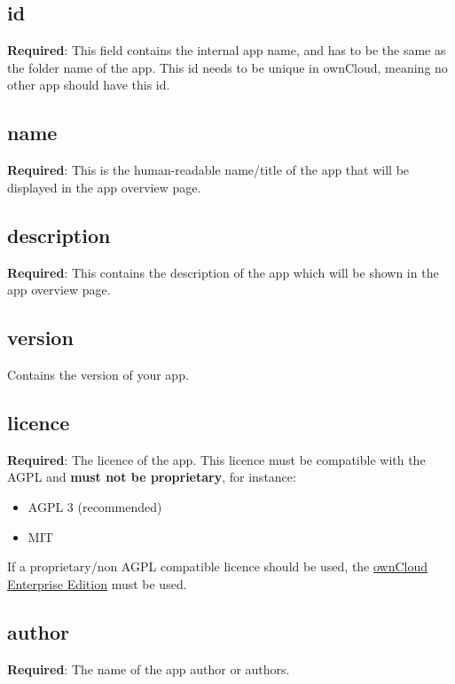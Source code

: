 \documentclass[letterpaper,10pt,english]{sphinxmanual}
\begin{document}
\subsection{id}
\label{app/info:id}
\textbf{Required}: This field contains the internal app name, and has to be the same as the folder name of the app. This id needs to be unique in ownCloud, meaning no other app should have this id.


\subsection{name}
\label{app/info:name}
\textbf{Required}: This is the human-readable name/title of the app that will be displayed in the app overview page.


\subsection{description}
\label{app/info:description}
\textbf{Required}: This contains the description of the app which will be shown in the app overview page.


\subsection{version}
\label{app/info:version}
Contains the version of your app.


\subsection{licence}
\label{app/info:licence}
\textbf{Required}: The licence of the app. This licence must be compatible with the AGPL and \textbf{must not be proprietary}, for instance:
\begin{itemize}
\item {} 
AGPL 3 (recommended)

\item {} 
MIT

\end{itemize}

If a proprietary/non AGPL compatible licence should be used, the \href{https://owncloud.com/overview/enterprise-edition}{ownCloud Enterprise Edition} must be used.


\subsection{author}
\label{app/info:author}
\textbf{Required}: The name of the app author or authors.
\end{document}
